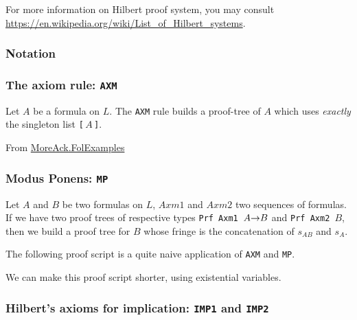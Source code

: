 For more information on Hilbert proof system, you may consult
\url{https://en.wikipedia.org/wiki/List_of_Hilbert_systems}.


\subsubsection{Notation}


  
\subsubsection{The axiom rule: \texttt{AXM}}

Let $A$ be a formula on $L$.  The \texttt{AXM} rule builds a proof-tree
of $A$ which uses \emph{exactly} the singleton list \texttt{[$\,A\,$]}.



\noindent From \href{../theories/html/hydras.MoreAck.FolExamples.html}{MoreAck.FolExamples}


\subsubsection{Modus Ponens: \texttt{MP}}

Let $A$ and $B$ be two formulas on $L$, $\textit{Axm1}$
 and $\textit{Axm2}$ two sequences of formulas.
If we have 
two proof trees of respective types \texttt{Prf Axm1 $A\mbox{$\rightarrow$} B$} and  \texttt{Prf Axm2 $B$}, then we build a proof tree
for $B$ whose fringe is the concatenation of $s_{AB}$ and $s_A$.



The following proof script is a quite naive application of 
\texttt{AXM} and \texttt{MP}.

\label{proof:PrfEx2}

We can make this proof script shorter, using existential variables.



\subsubsection{Hilbert's axioms for implication: \texttt{IMP1} and \texttt{IMP2}}


\label{proof:PrfEx3}

